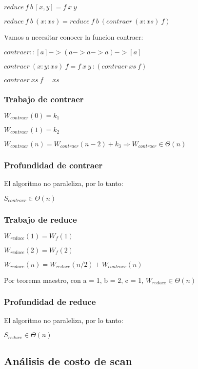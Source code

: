 \documentclass[a4paper,12pt]{article}
\begin{document}
$reduce\: f \:b\: [x,y] = f \:x \:y$

$reduce\: f\: b\: (x:xs) = reduce\: f\: b\: (contraer\: (x:xs)\: f)$

Vamos a necesitar conocer la funcion contraer:

$contraer :: [a] -> (a -> a -> a) -> [a]$

$contraer\: (x : y : xs)\: f = f\: x\: y\: : (contraer\: xs\: f)$

$contraer \:xs\: f = xs$

\subsubsection{Trabajo de contraer}

$W_{contraer}(0) = k_1$

$W_{contraer}(1) = k_2$

$W_{contraer}(n) = W_{contraer}(n-2) + k_3 \Rightarrow W_{contraer} \in \Theta(n)$

\subsubsection{Profundidad de contraer}

El algoritmo no paraleliza, por lo tanto:

$S_{contraer} \in \Theta(n)$

\subsubsection{Trabajo de reduce}

$W_{reduce}(1) = W_{f}(1)$

$W_{reduce}(2) = W_{f}(2)$

$W_{reduce}(n) = W_{reduce}(n/2) + W_{contraer}(n)$

Por teorema maestro, con a = 1, b = 2, c = 1, $W_{reduce} \in \Theta(n)$

\subsubsection{Profundidad de reduce}

El algoritmo no paraleliza, por lo tanto:

$S_{reduce} \in \Theta(n)$

\subsection{Análisis de costo de scan}
\end{document}

